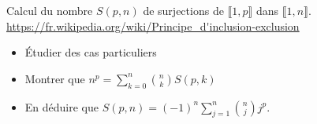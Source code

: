 Calcul du nombre $S(p,n)$ de surjections de $\llbracket 1, p \rrbracket$ dans $\llbracket 1, n \rrbracket$. \\

\url{https://fr.wikipedia.org/wiki/Principe_d'inclusion-exclusion}

\begin{itemize}
    \item Étudier des cas particuliers
    \item Montrer que $n^p = \sum\limits_{k=0}^{n} \binom{n}{k} S(p,k)$
    \item En déduire que $S(p,n) = (-1)^n \sum\limits_{j=1}^{n} \binom{n}{j} j^p$.
\end{itemize}